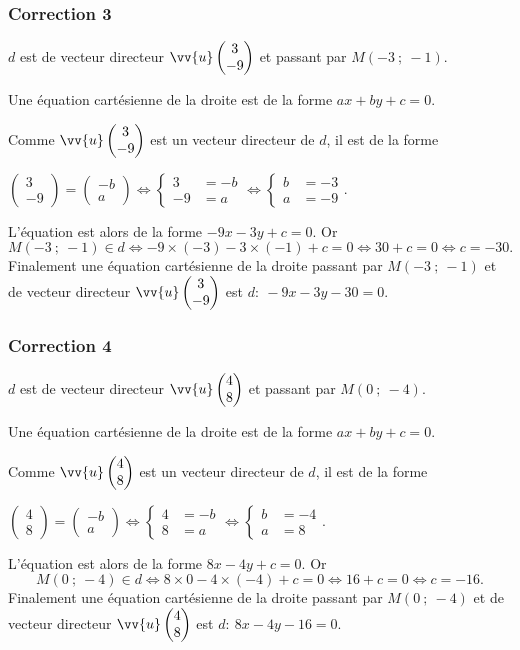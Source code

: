 \documentclass[15pt, mathserif]{beamer}
\newcommand{\vco}[2]{\begin{pmatrix} #1 \\ #2 \end{pmatrix}} %
\begin{document}
\begin{frame}
\vspace{-10mm}
	\frametitle{Correction 3}
\vspace*{2em}
$d$ est de vecteur directeur $\vv{u}\vco{3}{-9}$ et passant par $M\left(-3~;~-1\right)$.

Une équation cartésienne de la droite est de la forme $ax+by+c=0$.

Comme  $\vv{u}\vco{3}{-9}$ est un vecteur directeur de $d$, il est de la forme 

\smallskip

\hfil $\vco{3}{-9}=\vco{-b}{a} \Leftrightarrow \begin{cases} 3& = -b \\ -9&=a \end{cases} \Leftrightarrow \begin{cases} b &= -3\\ a &=-9\end{cases}.$\smallskip

 L'équation est alors de la forme $-9x-3y + c = 0$. Or \[M(-3~;~-1) \in d \Leftrightarrow -9\times \left(-3\right)-3\times \left(-1\right)+c=0 \Leftrightarrow 30+c = 0 \Leftrightarrow c = -30.\] Finalement une équation cartésienne de la droite passant par $M\left(-3~;~-1\right)$ et de vecteur directeur $\vv{u}\vco{3}{-9}$ est $d:~-9x-3y-30=0.$\end{frame}


\begin{frame}
\vspace{-10mm}
	\frametitle{Correction 4}
\vspace*{2em}
$d$ est de vecteur directeur $\vv{u}\vco{4}{8}$ et passant par $M\left(0~;~-4\right)$.

Une équation cartésienne de la droite est de la forme $ax+by+c=0$.

Comme  $\vv{u}\vco{4}{8}$ est un vecteur directeur de $d$, il est de la forme 

\smallskip

\hfil $\vco{4}{8}=\vco{-b}{a} \Leftrightarrow \begin{cases} 4& = -b \\ 8&=a \end{cases} \Leftrightarrow \begin{cases} b &= -4\\ a &=8\end{cases}.$\smallskip

 L'équation est alors de la forme $8x-4y + c = 0$. Or \[M(0~;~-4) \in d \Leftrightarrow 8\times 0-4\times \left(-4\right)+c=0 \Leftrightarrow 16+c = 0 \Leftrightarrow c = -16.\] Finalement une équation cartésienne de la droite passant par $M\left(0~;~-4\right)$ et de vecteur directeur $\vv{u}\vco{4}{8}$ est $d:~8x-4y-16=0.$\end{frame}
\end{document}
